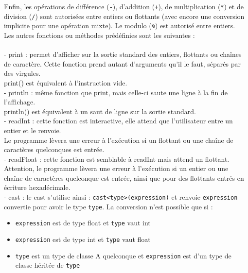 \documentclass[12pt]{article}
\begin{document}
Enfin, les opérations de différence (\verb?-?), d'addition (\verb?+?), de multiplication (\verb?*?) et de division (\verb?/?)
sont autorisées entre entiers ou flottants (avec encore une conversion implicite pour une opération mixte). Le modulo (\verb?%?) est autorisé entre entiers.\\

Les autres fonctions ou méthodes prédéfinies sont les suivantes :\\
\\- print : permet d'afficher sur la sortie standard des entiers, flottants ou chaînes de caractère. Cette fonction prend autant d'arguments qu'il le faut, séparés par des virgules.\\ print() est équivalent à l'instruction vide.
\\- println : même fonction que print, mais celle-ci saute une ligne à la fin de l'affichage.\\ println() est équivalent à un saut de ligne sur la sortie standard.
\\- readInt : cette fonction est interactive, elle attend que l'utilisateur entre un entier et le renvoie.\\ Le programme lèvera une erreur à l'exécution si un flottant ou une chaîne de caractères quelconques est entrée.
\\- readFloat : cette fonction est semblable à readInt mais attend un flottant. Attention, le programme lèvera une erreur à l'exécution si un entier ou une chaîne de caractères quelconque est entrée, ainsi que pour des flottants entrés en écriture hexadécimale.
\\- cast : le cast s'utilise ainsi : \verb?cast<type>(expression)? et renvoie \verb?expression? convertie pour avoir le type \verb?type?. La conversion n'est possible que si : \\
\begin{itemize}
     \item \verb?expression? est de type float et \verb?type? vaut int
     \item \verb?expression? est de type int et \verb?type? vaut float
     \item \verb?type? est un type de classe A quelconque et \verb?expression? est d'un type de classe héritée de \verb?type?
\end{itemize}
\end{document}
